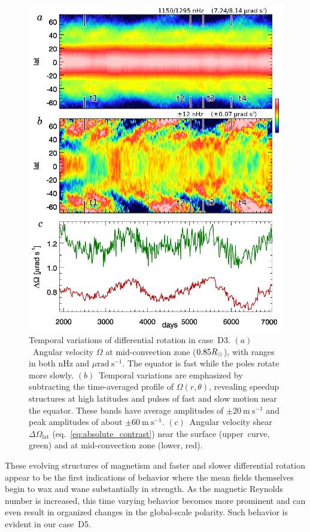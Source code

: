 \begin{figure}
  \begin{center}
    \includegraphics[width=0.8\linewidth]{figs/chapter_5/Figure_5/Figure_5.eps}
  \end{center}
  \caption[Temporal variations of differential rotation in case~D3]
	  {Temporal variations of differential rotation in case~D3.  $(a)$~Angular velocity
  $\Omega$ at mid-convection zone ($0.85R_\odot$), with ranges in both nHz
  and $\mu\mathrm{rad}\:\mathrm{s}^{-1}$.  The equator is
  fast while the poles rotate more slowly.  
  $(b)$~Temporal variations are emphasized by subtracting the
  time-averaged profile of $\Omega(r,\theta)$, revealing
  speedup structures at high latitudes and pulses of fast and slow
  motion near the equator.  These bands have average amplitudes of
  $\pm 20\:\mathrm{m}\:\mathrm{s}^{-1}$  and peak amplitudes of about
  $\pm 60\:\mathrm{m}\:\mathrm{s}^{-1}$.  $(c)$~Angular velocity
  shear $\Delta \Omega_\mathrm{lat}$ (eq.~\ref{eq:absolute_contrast}) near the
  surface (upper~curve, green) and at mid-convection zone (lower, red).
  \label{fig:case_D3_DR}
  }
\end{figure}


These evolving structures of magnetism and faster and slower
differential rotation appear to be the
first indications of behavior where the mean fields themselves begin to
wax and wane substantially in strength. As the magnetic Reynolds number is increased,
this time varying behavior becomes more prominent and can even result
in organized changes in the global-scale polarity.  Such behavior is
evident in our case~D5.



